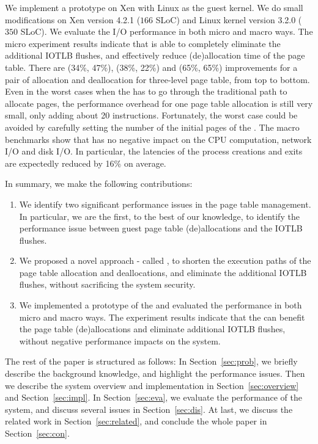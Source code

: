 We implement a prototype on Xen with Linux as the guest kernel. We do small modifications on Xen version 4.2.1 ($166$ SLoC) and Linux kernel version 3.2.0 ($350$ SLoC).
We evaluate the I/O performance in both micro and macro ways.
The micro experiment results indicate that \name is able to completely eliminate the additional IOTLB flushes, and effectively reduce (de)allocation time of the page table.
There are (34\%, 47\%), (38\%, 22\%) and (65\%, 65\%) improvements for a pair of allocation and deallocation for three-level page table, from top to bottom.
Even in the worst cases when the \name has to go through the traditional path to allocate pages, the performance overhead for one page table allocation is still very small, only adding about 20 instructions. 
Fortunately, the worst case could be avoided by carefully setting the number of the initial pages of the \cache.
The macro benchmarks show that \name has no negative impact on the CPU computation, network I/O and disk I/O.
In particular, the latencies of the process creations and exits are expectedly reduced by 16\% on average.

In summary, we make the following contributions:
\begin{enumerate}
\item We identify two significant performance issues in the page table management. In particular, we are the first, to the best of our knowledge, to identify the performance issue between guest page table (de)allocations and the IOTLB flushes.
\item We proposed a novel approach - called \name, to shorten the execution paths of the page table allocation and deallocations, and eliminate the additional IOTLB flushes, without sacrificing the system security.
\item We implemented a prototype of the \name and evaluated the performance in both micro and macro ways. The experiment results indicate that the \name can benefit the page table (de)allocations and eliminate additional IOTLB flushes, without negative performance impacts on the system.
\end{enumerate}

The rest of the paper is structured as follows: In Section~\ref{sec:prob}, we briefly describe the background knowledge, and highlight the performance issues. Then we describe the system overview and implementation in Section~\ref{sec:overview} and Section~\ref{sec:impl}. In Section~\ref{sec:eva}, we evaluate the performance of the \name system, and discuss several issues in Section~\ref{sec:dis}. At last, we discuss the related work in Section~\ref{sec:related}, and conclude the whole paper in Section~\ref{sec:con}.

